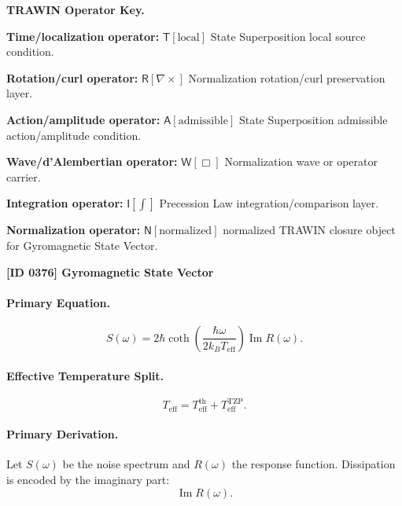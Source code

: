\par\vspace{0.45\baselineskip}
\noindent\begin{minipage}[t]{\linewidth}
\begingroup
\small
\raggedright
\textbf{TRAWIN Operator Key.}\par
\noindent\textbf{Time/localization operator:} $\mathsf{T}\!\left[\mathrm{local}\right]$ State Superposition local source condition.\par
\noindent\textbf{Rotation/curl operator:} $\mathsf{R}\!\left[\nabla\times\right]$ Normalization rotation/curl preservation layer.\par
\noindent\textbf{Action/amplitude operator:} $\mathsf{A}\!\left[\mathrm{admissible}\right]$ State Superposition admissible action/amplitude condition.\par
\noindent\textbf{Wave/d'Alembertian operator:} $\mathsf{W}\!\left[\Box\right]$ Normalization wave or operator carrier.\par
\noindent\textbf{Integration operator:} $\mathsf{I}\!\left[\int\right]$ Precession Law integration/comparison layer.\par
\noindent\textbf{Normalization operator:} $\mathsf{N}\!\left[\mathrm{normalized}\right]$ normalized TRAWIN closure object for Gyromagnetic State Vector.\par
\endgroup
\end{minipage}

\clearpage
\noindent\textbf{[ID 0376] Gyromagnetic State Vector}\par
\vspace{0.35em}
\paragraph{Primary Equation.}
\begin{equation}
S(\omega)
=
2\hbar
\coth\left(
\frac{\hbar\omega}{2k_B T_{\mathrm{eff}}}
\right)
\operatorname{Im}R(\omega).
\end{equation}

\paragraph{Effective Temperature Split.}
\begin{equation}
T_{\mathrm{eff}}
=
T_{\mathrm{eff}}^{\mathrm{th}}
+
T_{\mathrm{eff}}^{\mathrm{TZP}} .
\end{equation}

\paragraph{Primary Derivation.}
Let $S(\omega)$ be the noise spectrum and $R(\omega)$ the response function.  
Dissipation is encoded by the imaginary part:
\begin{equation}
\operatorname{Im}R(\omega).
\end{equation}

